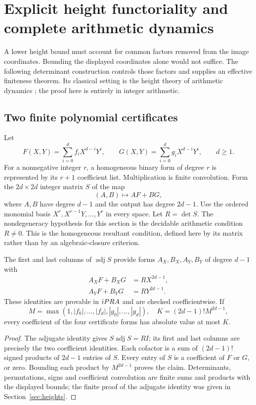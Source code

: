 \section{Explicit height functoriality and complete arithmetic dynamics}
\label{sec:dynamics}

A lower height bound must account for common factors removed from the image
coordinates. Bounding the displayed coordinates alone would not suffice.
The following determinant construction controls those factors and supplies
an effective finiteness theorem. Its classical setting is the height theory
of arithmetic dynamics \cite{silverman,silverman2011}; the proof here is
entirely in integer arithmetic.

\subsection{Two finite polynomial certificates}

Let
\[
 F(X,Y)=\sum_{i=0}^d f_iX^{d-i}Y^i,\qquad
 G(X,Y)=\sum_{i=0}^d g_iX^{d-i}Y^i,\qquad d\ge1.
\]
For a nonnegative integer $r$, a homogeneous binary form of degree $r$ is
represented by its $r+1$ coefficient list. Multiplication is finite
convolution. Form the $2d\times2d$ integer matrix $S$ of the map
\[
   (A,B)\longmapsto AF+BG,
\]
where $A,B$ have degree $d-1$ and the output has degree $2d-1$.
Use the ordered monomial basis $X^r,X^{r-1}Y,\ldots,Y^r$ in every space.
Let $R=\det S$. The nondegeneracy hypothesis for this section is the
decidable arithmetic condition $R\ne0$. This is the homogeneous resultant
condition, defined here by its matrix rather than by an algebraic-closure
criterion.

\begin{lemma}\label{lem:resultant}
The first and last columns of $\operatorname{adj}S$ provide forms
$A_X,B_X,A_Y,B_Y$ of degree $d-1$ with
\begin{align}
 A_XF+B_XG&=R X^{2d-1},\label{eq:bezout-X}\\
 A_YF+B_YG&=R Y^{2d-1}.\label{eq:bezout-Y}
\end{align}
These identities are provable in $iPRA$ and are checked coefficientwise.
If
\[
 M=\max(1,|f_0|,\ldots,|f_d|,|g_0|,\ldots,|g_d|),
 \quad K=(2d-1)!M^{2d-1},
\]
every coefficient of the four certificate forms has absolute value at most
$K$.
\end{lemma}
\begin{proof}
The adjugate identity gives $S\operatorname{adj}S=RI$; its first and last
columns are precisely the two coefficient identities. Each cofactor is a
sum of $(2d-1)!$ signed products of $2d-1$ entries of $S$. Every entry of
$S$ is a coefficient of $F$ or $G$, or zero. Bounding each product by
$M^{2d-1}$ proves the claim. Determinants, permutations, signs and coefficient
convolution are finite sums and products with the displayed bounds; the
finite proof of the adjugate identity was given in
Section~\ref{sec:heights}.
\end{proof}

